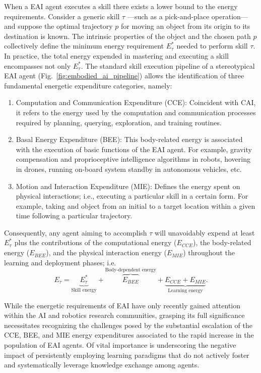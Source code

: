 \documentclass[12pt]{article}
\begin{document}
When a EAI agent executes a skill there exists a lower bound to the energy requirements. Consider a generic skill $\tau$ ---such as a pick-and-place operation--- and suppose the optimal trajectory $p$ for moving an object from its origin to its destination is known. The intrinsic properties of the object and the chosen path $p$ collectively define the minimum energy requirement $E^*_{\tau}$ needed to perform skill $\tau$. In practice, the total energy expended in mastering and executing a skill encompasses not only $E^*_{\tau}$. The standard skill execution pipeline of a stereotypical EAI agent (Fig.~\ref{fig:embodied_ai_pipeline}) allows the identification of three fundamental energetic expenditure categories, namely:
\begin{enumerate}
	\item Computation and Communication Expenditure (CCE): Coincident with CAI, it refers to the energy used by the computation and communication processes required by planning, querying, exploration, and training routines.
	\item Basal Energy Expenditure (BEE): This body-related energy is associated with the execution of basic functions of the EAI agent. For example, gravity compensation and proprioceptive intelligence algorithms in robots, hovering in drones, running on-board system standby in autonomous vehicles, etc.
	\item Motion and Interaction Expenditure (MIE): Defines the energy spent on physical interactions; i.e., executing a particular skill in a certain form. For example, taking and object from an initial to a target location within a given time following a particular trajectory.
\end{enumerate}
Consequently, any agent aiming to accomplish $\tau$ will unavoidably expend at least $E^*_{\tau}$ plus the contributions of the computational energy ($E_{CCE}$), the body-related energy ($E_{BEE}$), and the physical interaction energy ($E_{MIE}$) throughout the learning and deployment phases; i.e.
\begin{equation}
	E_{\tau} =  \underbrace{E^*_{\tau}}_{\text{Skill energy}} + \overbrace{E_{BEE}}^{\text{Body-dependent energy}} + \underbrace{E_{CCE} + E_{MIE}}_{\text{Learning energy}}.
\end{equation}

While the energetic requirements of EAI have only recently gained attention within the AI and robotics research communities, grasping its full significance necessitates recognizing the challenges posed by the substantial escalation of the CCE, BEE, and MIE energy expenditures associated to the rapid increase in the population of EAI agents. Of vital importance is underscoring the negative impact of persistently employing learning paradigms that do not actively foster and systematically leverage knowledge exchange among agents.
\end{document}
